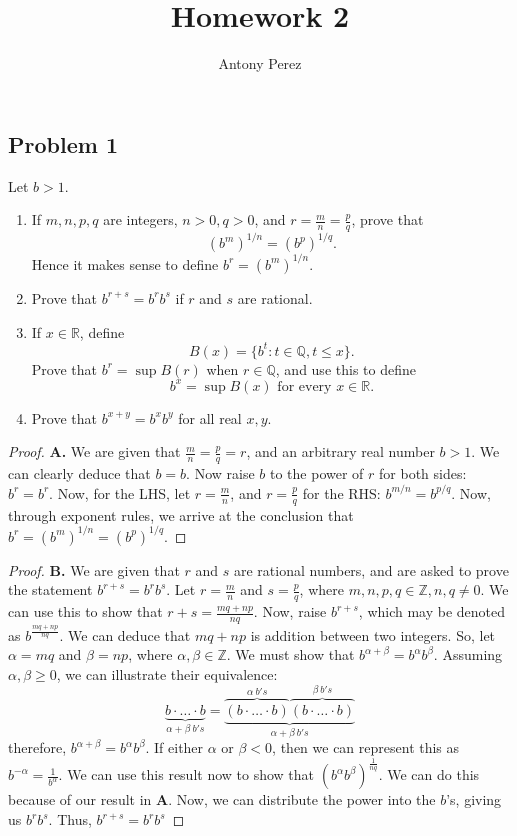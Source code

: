 \documentclass{amsart}
\title{Homework 2}
\author{Antony Perez}
\begin{document}
\maketitle
\subsection*{Problem 1} 
Let $b > 1$. 
\begin{enumerate}[label=(\alph*)]
    \item If $m,n,p,q$ are integers, $n > 0, q > 0$, and $r = \frac{m}{n}=\frac{p}{q}$, prove that \[(b^m)^{1/n} = (b^p)^{1/q}.\] Hence it makes sense to define $b^r = (b^m)^{1/n}$.
    \item Prove that $b^{r+s}=b^rb^s$ if $r$ and $s$ are rational.
    \item If $x \in \mathbb{R}$, define \[B(x) = \{b^t : t \in \mathbb{Q}, t \leq x\}. \] Prove that $b^r = \sup B(r)$ when $r \in \mathbb{Q}$, and use this to define \[b^x = \sup B(x) \text{ for every } x \in \mathbb{R}.\]
    \item Prove that $b^{x+y} = b^xb^y$ for all real $x,y$. 
\end{enumerate}
\begin{proof}
    \textbf{A.} We are given that $\frac{m}{n} = \frac{p}{q} = r$, and an arbitrary real number $b > 1$. We can clearly deduce that $b = b$. Now raise $b$ to the power of $r$ for both sides: $b^r = b^r$. Now, for the LHS, let $r = \frac{m}{n}$, and $r = \frac{p}{q}$ for the RHS: $b^{m/n} = b^{p/q}$. Now, through exponent rules, we arrive at the conclusion that $b^r = (b^m)^{1/n} = (b^p)^{1/q}$.
\end{proof}
\begin{proof}
    \textbf{B.} We are given that $r$ and $s$ are rational numbers, and are asked to prove the statement $b^{r+s} = b^rb^s$. Let $r = \frac{m}{n}$ and $s = \frac{p}{q}$, where $m,n,p,q \in \mathbb{Z},  n ,q \neq 0$.
    We can use this to show that $r+s = \frac{mq+np}{nq}$. Now, raise $b^{r+s}$, which may be denoted as $b^{\frac{mq+np}{nq}}$. We can deduce that $mq + np$ is addition between two integers. So, let $\alpha = mq$ and $\beta =  np$, where $\alpha,\beta \in \mathbb{Z}$.
    We must show that $b^{\alpha + \beta} = b^{\alpha}b^{\beta}$. Assuming $\alpha, \beta \geq 0$, we can illustrate their equivalence: 
    \[
    \underbrace{ b\cdot \ldots \cdot b}_{\alpha + \beta \ b's} = \underbrace{\overbrace{(b \cdot \ldots \cdot b)}^{\alpha \ b's} \overbrace{(b \cdot \ldots \cdot b)}^{\beta \ b's} }_{\alpha + \beta \ b's}
    \]
    therefore, $b^{\alpha + \beta} = b^{\alpha} b^{\beta}$. If either $\alpha$ or $\beta < 0$, then we can represent this as $b^{-\alpha} = \frac{1}{b^\alpha}$. We can use this result now to show that $(b^\alpha b^\beta)^\frac{1}{nq}$. We can do this because of our result in \textbf{A}. Now, we can distribute the power into the $b$'s, giving us $b^rb^s$.
    Thus, $b^{r+s} = b^rb^s$
\end{proof}
\end{document}
